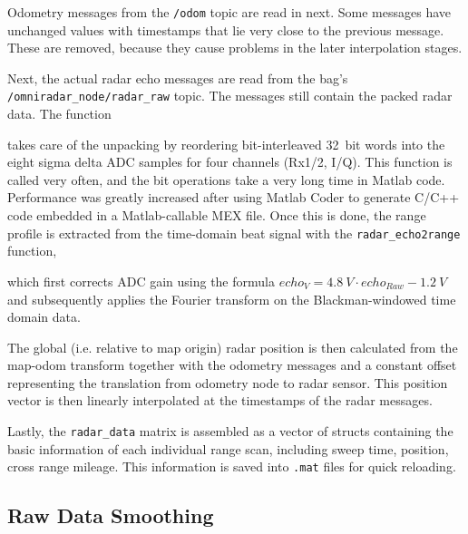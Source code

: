 Odometry messages from the \texttt{/odom} topic are read in next. Some messages have unchanged values with timestamps that lie very close to the previous message. These are removed, because they cause problems in the later interpolation stages.

Next, the actual radar echo messages are read from the bag's \texttt{/omniradar\_node/radar\_raw} topic. The messages still contain the packed radar data. The function
\begin{Shaded}
\begin{Highlighting}[]
\end{Highlighting}
\end{Shaded}
takes care of the unpacking by reordering bit-interleaved \SI{32}{bit} words into the eight sigma delta ADC samples for four channels (Rx1/2, I/Q). This function is called very often, and the bit operations take a very long time in Matlab code. Performance was greatly increased after using Matlab Coder to generate C/C++ code embedded in a Matlab-callable MEX file. Once this is done, the range profile is extracted from the time-domain beat signal with the \texttt{radar\_echo2range} function,
\begin{Shaded}
\begin{Highlighting}[]
\end{Highlighting}
\end{Shaded}
which first corrects ADC gain using the formula $echo_{V} = \SI{4.8}{V} \cdot echo_{Raw} - \SI{1.2}{V}$ and subsequently applies the Fourier transform on the Blackman-windowed time domain data.

The global (i.e. relative to map origin) radar position is then calculated from the map-odom transform together with the odometry messages and a constant offset representing the translation from odometry node to radar sensor. This position vector is then linearly interpolated at the timestamps of the radar messages.

Lastly, the \texttt{radar\_data} matrix is assembled as a vector of structs containing the basic information of each individual range scan, including sweep time, position, cross range mileage. This information is saved into \texttt{.mat} files for quick reloading.

\subsection{Raw Data Smoothing}\label{raw-data-smoothing}


